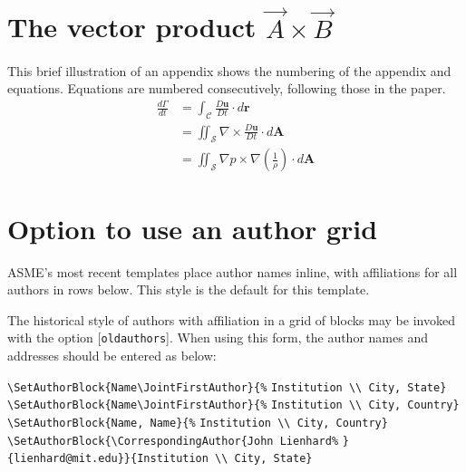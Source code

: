 \documentclass[varvw,largesc,upint,mathalfa=cal=euler,hyphenate,balance,lang-second=french,lang=english,colorlinks]{asmeconf} %
\begin{document}
\appendix


\section[The vector product A\times B]{The vector product $\vec{A}\times\vec{B}$}\label{appendix:a}

This brief illustration of an appendix shows the numbering of the appendix and equations. Equations are numbered
consecutively, following those in the paper.
\begin{align}
\frac{d\Gamma}{dt}   &{}= \int_{\mathcal{C}} \frac{D\mathbf{u}}{Dt} \cdot d\mathbf{r}\\
                                  &{}= \iint_{\mathcal{S}} \nabla \times \frac{D\mathbf{u}}{Dt}  \cdot d\mathbf{A}\\
                                  &{}= \iint_{\mathcal{S}}  \nabla p \times \nabla \left( \frac{1}{\rho}\right) \cdot d\mathbf{A}
\end{align}


\section{Option to use an author grid}\label{appendix:b}

ASME's most recent templates place author names inline, with affiliations for all authors in rows below. 
This style is the default for this template.  

The historical style of authors with affiliation in a grid of blocks may be invoked with
the option [\texttt{oldauthors}].  When using this form, the author names and addresses should be entered as below:

\smallskip
\noindent\verb|\SetAuthorBlock{Name\JointFirstAuthor}{%|
 \hbox{}\hfil\verb|Institution \\ City, State}| 
\verb|\SetAuthorBlock{Name\JointFirstAuthor}{%|
 \hbox{}\hfil\verb|Institution \\ City, Country}|
\verb|\SetAuthorBlock{Name, Name}{%|\hfil\hbox{}
 \noindent\hbox{}\hfil\verb|Institution \\ City, Country}|
\verb|\SetAuthorBlock{\CorrespondingAuthor{John Lienhard%|
 \hbox{}\hfil\verb|}{lienhard@mit.edu}}{Institution \\ City, State}|
 
\end{document}
